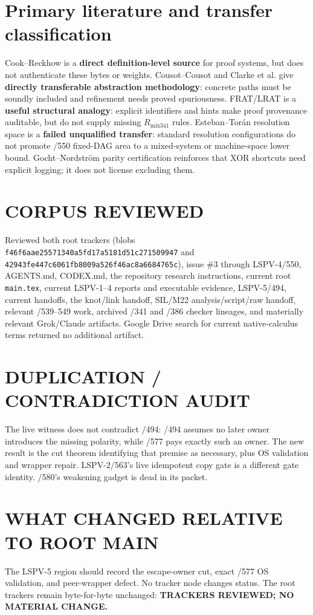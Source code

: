 \documentclass[11pt]{article}
\begin{document}
\section*{Primary literature and transfer classification}
Cook--Reckhow is a \textbf{direct definition-level source} for proof systems,
but does not authenticate these bytes or weights. Cousot--Cousot and Clarke et
al. give \textbf{directly transferable abstraction methodology}: concrete paths
must be soundly included and refinement needs proved spuriousness. FRAT/LRAT is
a \textbf{useful structural analogy}: explicit identifiers and hints make proof
provenance auditable, but do not supply missing $R_{\mathrm{mix341}}$ rules.
Esteban--Tor\'an resolution space is a \textbf{failed unqualified transfer}:
standard resolution configurations do not promote /550 fixed-DAG area to a
mixed-system or machine-space lower bound. Gocht--Nordstr\"om parity
certification reinforces that XOR shortcuts need explicit logging; it does not
license excluding them.

\section*{CORPUS REVIEWED}
Reviewed both root trackers (blobs
\texttt{f46f6aae25571340a5fd17a5181d51c271509947} and
\texttt{42943fe447c6061fb8009a526f46ac8a6684765c}), issue \#3 through
LSPV-4/550, AGENTS.md, CODEX.md, the repository research instructions, current
root \texttt{main.tex}, current LSPV-1--4 reports and executable evidence,
LSPV-5/494, current handoffs, the knot/link handoff, SIL/M22
analysis/script/raw handoff, relevant /539--549 work, archived /341 and /386
checker lineages, and materially relevant Grok/Claude artifacts. Google Drive
search for current native-calculus terms returned no additional artifact.

\section*{DUPLICATION / CONTRADICTION AUDIT}
The live witness does not contradict /494: /494 assumes no later owner
introduces the missing polarity, while /577 pays exactly such an owner. The new
result is the cut theorem identifying that premise as necessary, plus OS
validation and wrapper repair. LSPV-2/563's live idempotent copy gate is a
different gate identity. /580's weakening gadget is dead in its packet.

\section*{WHAT CHANGED RELATIVE TO ROOT MAIN}
The LSPV-5 region should record the escape-owner cut, exact /577 OS validation,
and peer-wrapper defect. No tracker node changes status. The root trackers
remain byte-for-byte unchanged: \textbf{TRACKERS REVIEWED; NO MATERIAL CHANGE.}
\end{document}
